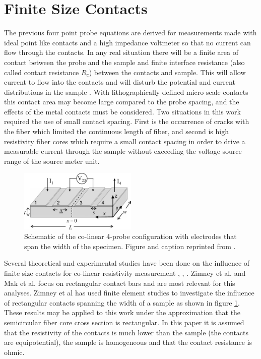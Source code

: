   
    \FloatBarrier
\section{Finite Size Contacts}
 The previous four point probe equations are derived for measurements made with ideal point like contacts and a high impedance voltmeter so that no current can flow through the contacts. In any real situation there will be a finite area of contact between the probe and the sample and finite interface resistance (also called contact resistance $R_c$) between the contacts and sample. This will allow current to flow into the contacts and will disturb the potential and current distributions in the sample \cite{Zimney2007CorrectionStudy}. With lithographically defined micro scale contacts this contact area may become large compared to the probe spacing, and the effects of the metal contacts must be considered. %
 Two situations in this work required the use of small contact spacing. First is the occurrence of cracks with the fiber which limited the continuous length of fiber, and second is high resistivity fiber cores which require a small contact spacing in order to drive a measurable current through the sample without exceeding the voltage source range of the source meter unit. 
 
  
\begin{figure}[h]
  \centering
    \includegraphics[width=0.5\textwidth]{fig/4pp/finite_size_contacts.png}
 \caption{Schematic of the co-linear 4-probe configuration with electrodes that span the width of the specimen. Figure and caption reprinted from \cite{Zimney2007CorrectionStudy}.}
\label{fig1}
\end{figure}

 Several theoretical and experimental studies have been done on the influence of finite size contacts for co-linear resistivity measurement \cite{Zimney2007CorrectionStudy}, \cite{Mak1989SpecificArsenide}, \cite{Ilse2014GeometricalMeasurements} \cite{Esposito2000DeterminationCrystals}. Zimney et al. and Mak et al. focus on rectangular contact bars and are most relevant for this analyses. Zimney et al has used finite element studies to investigate the influence of rectangular contacts spanning the width of a sample as shown in figure \ref{fig1}. These results may be applied to this work under the approximation that the semicircular fiber core cross section is rectangular. In this paper it is assumed that the resistivity of the contacts is much lower than the sample (the contacts are equipotential), the sample is homogeneous and that the contact resistance is ohmic.%
 
